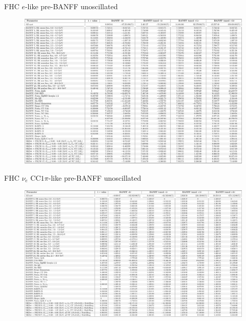 \documentclass{beamer}
\begin{document}
\begin{frame}{FHC $e$-like pre-BANFF unoscillated}
	\centering
	\begin{figure}
		\includegraphics[page=1, trim={0cm 0cm 0cm 0cm}, clip, scale=0.3] {images/variations/tables/systematic_tables_prefit_unosc_1Re}
	\end{figure}
\end{frame}

\begin{frame}{FHC $\nu_e\text{ CC}1\pi$-like pre-BANFF unoscillated}
	\centering
	\begin{figure}
		\includegraphics[page=1, trim={0cm 0cm 0cm 0cm}, clip, scale=0.28] {images/variations/tables/systematic_tables_prefit_unosc_MultiRe}
	\end{figure}
\end{frame}
\end{document}
